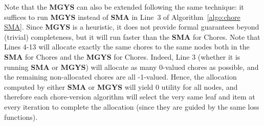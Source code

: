 \documentclass[]{article}
\begin{document}
\vspace{0.2cm}
Note that the \textbf{MGYS} can also be extended following the same technique: it suffices to run \textbf{MGYS} instead of \textbf{SMA} in Line~3 of Algorithm~\ref{algo:chore SMA}. Since \textbf{MGYS} is a heuristic, it does not provide formal guarantees beyond (trivial) completeness, but it will run faster than the \textbf{SMA} for Chores. Note that Lines 4-13 will allocate exactly the same chores to the same nodes both in the \textbf{SMA} for Chores and the \textbf{MGYS} for Chores. Indeed, Line 3 (whether it is running \textbf{SMA} or \textbf{MGYS}) will allocate as many 0-valued chores as possible, and the remaining non-allocated chores are all -1-valued. Hence, the allocation computed by either \textbf{SMA} or \textbf{MGYS} will yield 0 utility for all nodes, and therefore each chore-version algorithm will select the very same leaf and item at every iteration to complete the allocation (since they are guided by the same loss functions).
\end{document}
